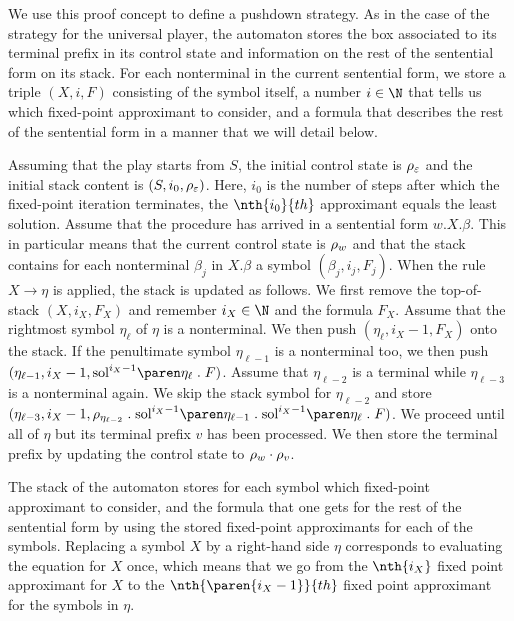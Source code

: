 \documentclass[../../diss.tex]{subfiles}
\begin{document}
We use this proof concept to define a pushdown strategy.
As in the case of the strategy for the universal player, the automaton stores the box associated to its terminal prefix in its control state and information on the rest of the sentential form on its stack.
For each nonterminal in the current sentential form, we store a triple
\(
    (X, i, F)
\)
consisting of the symbol itself, a number $i \in \N$ that tells us which fixed-point approximant to consider, and a formula that describes the rest of the sentential form in a manner that we will detail below.

Assuming that the play starts from $S$, the initial control state is $\tbox{\eps}$ and the initial stack content is $(S,i_0,\tbox{\eps})$.
Here, $i_0$ is the number of steps after which the fixed-point iteration terminates, \ie the $\nth{i_0}{th}$ approximant equals the least solution.
Assume that the procedure has arrived in a sentential form $w.X.\beta$.
This in particular means that the current control state is $\tbox{w}$ and that the stack contains for each nonterminal $\beta_j$ in $X.\beta$ a symbol $(\beta_j, i_j, F_j)$.
When the rule $X \to \eta$ is applied, the stack is updated as follows.
We first remove the top-of-stack $(X, i_X, F_X)$ and remember $i_X \in \N$ and the formula $F_X$.
Assume that the rightmost symbol $\eta_\ell$ of $\eta$ is a nonterminal.
We then push
$( \eta_\ell, i_X - 1, F_X)$ onto the stack.
If the penultimate symbol $\eta_{\ell - 1}$ is a nonterminal too, we then push
$( \eta_{\ell - 1}, i_X - 1, \sol{i_X - 1}{\eta_{\ell}} \comp F)$.
Assume that $\eta_{\ell - 2}$ is a terminal while $\eta_{\ell - 3}$ is a nonterminal again.
We skip the stack symbol for $\eta_{\ell - 2}$ and store
$( \eta_{\ell - 3}, i_X - 1, \tbox{\eta_{\ell - 2}} \comp \sol{i_X - 1}{\eta_{\ell - 1}} \comp \sol{i_X - 1}{\eta_{\ell}} \comp F)$.
We proceed until all of $\eta$ but its terminal prefix $v$ has been processed.
We then store the terminal prefix by updating the control state to $\tbox{w} \relcomp \tbox{v}$.

The stack of the automaton stores for each symbol which fixed-point approximant to consider, and the formula that one gets for the rest of the sentential form by using the stored fixed-point approximants for each of the symbols.
Replacing a symbol $X$ by a right-hand side $\eta$ corresponds to evaluating the equation for $X$ once, which means that we go from the $\nth{i_X}$ fixed point approximant for $X$ to the $\nth{\paren{i_X - 1}}{th}$ fixed point approximant for the symbols in $\eta$.
\end{document}
